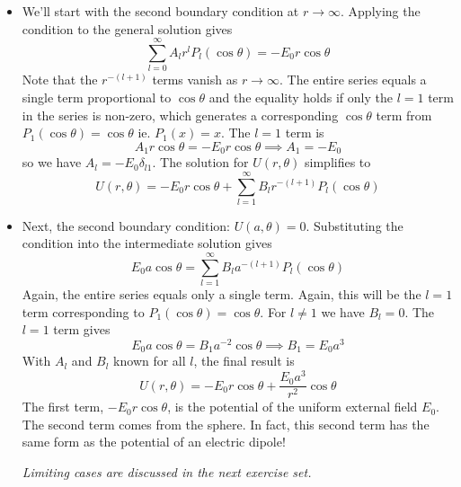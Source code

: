 \documentclass[11pt, a4paper]{article}
\begin{document}
\begin{itemize}
	\item We'll start with the second boundary condition at $ r \to \infty $. Applying the condition to the general solution gives
	\begin{equation*}
		\sum_{l = 0}^{\infty} A_{l}r^{l} P_{l}(\cos \theta) = -E_{0}r \cos \theta
	\end{equation*}
	Note that the $ r^{-(l+1)} $ terms vanish as $ r \to \infty $. The entire series equals a single term proportional to $ \cos \theta $ and the equality holds if only the $ l = 1 $ term in the series is non-zero, which generates a corresponding $ \cos \theta $ term from $ P_{1}(\cos \theta) = \cos \theta $ ie. $ P_{1}(x) = x $. The $ l = 1 $ term is
	\begin{equation*}
		A_{1}r \cos \theta = -E_{0}r \cos \theta \implies A_{1} = - E_{0}
	\end{equation*}
	so we have $ A_{l} = -E_{0}\delta_{l1} $. The solution for $ U(r, \theta) $ simplifies to
	\begin{equation*}
		U(r, \theta) = -E_{0}r \cos \theta + \sum_{l=1}^{\infty} B_{l}r^{-(l+1)}P_{l}(\cos \theta)
	\end{equation*}
	
	\item Next, the second boundary condition: $ U(a, \theta) = 0 $. Substituting the condition into the intermediate solution gives
	\begin{equation*}
		E_{0}a\cos \theta = \sum_{l=1}^{\infty} B_{l}a^{-(l+1)}P_{l}(\cos \theta)
	\end{equation*}
	Again, the entire series equals only a single term. Again, this will be the $ l = 1 $ term corresponding to $ P_{1}(\cos \theta) = \cos \theta $. For $ l \neq 1 $ we have $ B_{l} = 0 $. The $ l = 1 $ term gives
	\begin{equation*}
		E_{0}a\cos \theta = B_{1}a^{-2}\cos \theta \implies B_{1} = E_{0}a^{3}
	\end{equation*}
	With $ A_{l} $ and $ B_{l} $ known for all $ l $, the final result is
	\begin{equation*}
		U(r, \theta) = - E_{0} r \cos \theta + \frac{E_{0}a^{3}}{r^{2}}\cos \theta
	\end{equation*}
	The first term, $ - E_{0} r \cos \theta $, is the potential of the uniform external field $ E_{0} $. The second term comes from the sphere. In fact, this second term has the same form as the potential of an electric dipole!
	
	\textit{Limiting cases are discussed in the next exercise set.}
\end{itemize}
\end{document}
